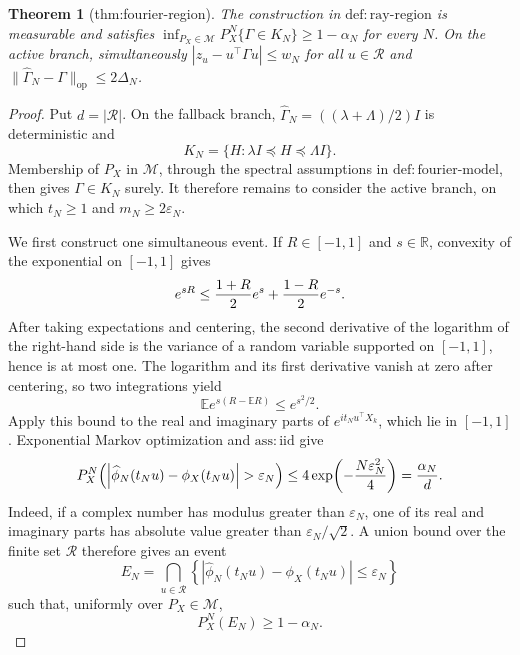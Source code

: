 \documentclass{article}
\newtheorem{theorem}{Theorem}
\begin{document}
\begin{theorem}[thm:fourier-region]\label{thm:fourier-region}
The construction in \(\mathrm{def:ray\text{-}region}\) is measurable and satisfies \(\inf_{P_X\in\mathcal M}P_X^N\{\Gamma\in K_N\}\ge1-\alpha_N\) for every \(N\). On the active branch, simultaneously \(|z_u-u^\top\Gamma u|\le w_N\) for all \(u\in\mathcal R\) and \(\|\widehat\Gamma_N-\Gamma\|_{\mathrm{op}}\le2\Delta_N\).
\end{theorem}
\begin{proof}
Put \(d=|\mathcal R|\).  On the fallback branch, \(\widehat\Gamma_N=((\lambda+\Lambda)/2)I\) is deterministic and
\[
 K_N=\{H:\lambda I\preceq H\preceq\Lambda I\}.
\]
Membership of \(P_X\) in \(\mathcal M\), through the spectral assumptions in \(\mathrm{def:fourier\text{-}model}\), then gives \(\Gamma\in K_N\) surely.  It therefore remains to consider the active branch, on which \(t_N\ge1\) and \(m_N\ge2\varepsilon_N\).

We first construct one simultaneous event.  If \(R\in[-1,1]\) and \(s\in\mathbb R\), convexity of the exponential on \([-1,1]\) gives
\[
 e^{sR}\le {1+R\over2}e^s+{1-R\over2}e^{-s}.
\]
After taking expectations and centering, the second derivative of the logarithm of the right-hand side is the variance of a random variable supported on \([-1,1]\), hence is at most one.  The logarithm and its first derivative vanish at zero after centering, so two integrations yield
\[
 \mathbb E e^{s(R-\mathbb ER)}\le e^{s^2/2}.
\]
Apply this bound to the real and imaginary parts of \(e^{it_Nu^\top X_k}\), which lie in \([-1,1]\).  Exponential Markov optimization and \(\mathrm{ass:iid}\) give
\[
 P_X^N\!\left(\left|\widehat\phi_N(t_Nu)-\phi_X(t_Nu)\right|>\varepsilon_N\right)
 \le4\exp\!\left(-{N\varepsilon_N^2\over4}\right)
 ={\alpha_N\over d}.
\]
Indeed, if a complex number has modulus greater than \(\varepsilon_N\), one of its real and imaginary parts has absolute value greater than \(\varepsilon_N/\sqrt2\).  A union bound over the finite set \(\mathcal R\) therefore gives an event
\[
 E_N=\bigcap_{u\in\mathcal R}
 \left\{\left|\widehat\phi_N(t_Nu)-\phi_X(t_Nu)\right|\le\varepsilon_N\right\}
\]
such that, uniformly over \(P_X\in\mathcal M\),
\[
 P_X^N(E_N)\ge1-\alpha_N. \tag{1}
\]


\end{proof}
\end{document}
